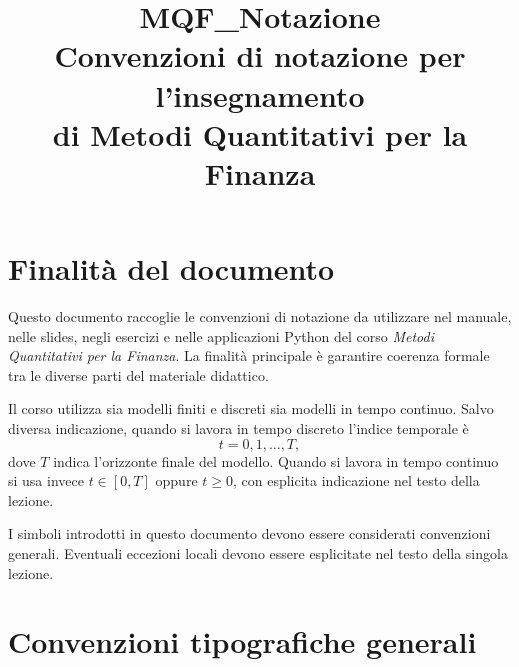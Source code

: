 \documentclass[12pt,a4paper]{article}
\title{MQF\_Notazione\\[0.2cm]
\large Convenzioni di notazione per l'insegnamento\\
\large di Metodi Quantitativi per la Finanza}
\author{}
\date{}
\newcommand{\1}{\mathbf{1}}
\begin{document}
\maketitle

\section{Finalit\`a del documento}

Questo documento raccoglie le convenzioni di notazione da utilizzare nel
manuale, nelle slides, negli esercizi e nelle applicazioni Python del corso
\emph{Metodi Quantitativi per la Finanza}. La finalit\`a principale \`e
garantire coerenza formale tra le diverse parti del materiale didattico.

Il corso utilizza sia modelli finiti e discreti sia modelli in tempo continuo.
Salvo diversa indicazione, quando si lavora in tempo discreto l'indice temporale \`e
\[
 t=0,1,\ldots,T,
\]
dove $T$ indica l'orizzonte finale del modello. Quando si lavora in tempo
continuo si usa invece $t\in[0,T]$ oppure $t\geq0$, con esplicita indicazione
nel testo della lezione.

I simboli introdotti in questo documento devono essere considerati convenzioni
generali. Eventuali eccezioni locali devono essere esplicitate nel testo della
singola lezione.

\section{Convenzioni tipografiche generali}
\end{document}

